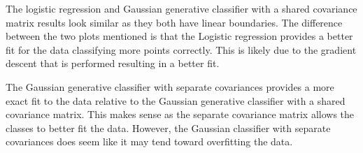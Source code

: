 \documentclass[submit]{harvardml}
\begin{document}
\begin{enumerate}
    The logistic regression and Gaussian generative classifier with a shared covariance matrix results look similar as they both have linear boundaries. The difference between the two plots mentioned is that the Logistic regression provides a better fit for the data classifying more points correctly. This is likely due to the gradient descent that is performed resulting in a better fit. 
    
    The Gaussian generative classifier with separate covariances provides a more exact fit to the data relative to the Gaussian generative classifier with a shared covariance matrix. This makes sense as the separate covariance matrix allows the classes to better fit the data. However, the Gaussian classifier with separate covariances does seem like it may tend toward overfitting the data. 
    

\end{enumerate}
\end{document}
